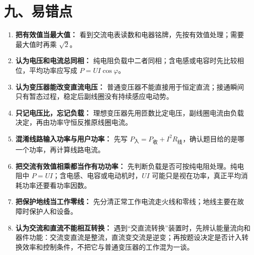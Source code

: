 \section*{九、易错点}
\begin{mistakebox}
\begin{enumerate}
  \item \textbf{把有效值当最大值：} 看到交流电表读数和电器铭牌，先按有效值处理；需要最大值时再乘 $\sqrt2$。
  \item \textbf{认为电压和电流总同相：} 纯电阻负载中二者同相；含电感或电容时先比较相位，平均功率应写成 $P=UI\cos\varphi$。
  \item \textbf{认为变压器能改变直流电压：} 普通变压器不能直接用于恒定直流；接通瞬间只有暂态过程，稳定后副线圈没有持续感应电动势。
  \item \textbf{只记电压比，忘记负载：} 理想变压器先用匝数比定电压，副线圈电流由负载决定，再由功率守恒反推原线圈电流。
  \item \textbf{混淆线路输入功率与用户功率：} 先写 $P_{\text{入}}=P_{\text{收}}+I^2R_{\text{线}}$，确认题目给的是哪一个功率，再计算线路电流。
  \item \textbf{把交流有效值相乘都当作有功功率：} 先判断负载是否可按纯电阻处理。纯电阻中 $P=UI$；含电感、电容或电动机时，$UI$ 可能只是视在功率，真正平均消耗功率还要看功率因数。
  \item \textbf{把保护地线当工作零线：} 先分清正常工作电流走火线和零线；地线主要在故障时保护人和设备。
  \item \textbf{认为交流和直流不能相互转换：} 遇到“交直流转换”装置时，先辨认能量流向和器件功能：交流变直流是整流，直流变交流是逆变；再按题设决定是否计入转换效率和控制条件，不把它与普通变压器的工作混为一谈。
\end{enumerate}
\end{mistakebox}

